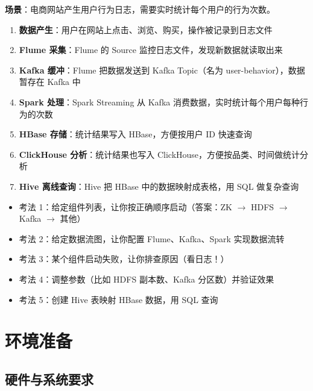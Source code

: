 \documentclass[12pt,a4paper]{article}
\begin{document}
\begin{knowledgebox}
\textbf{场景}：电商网站产生用户行为日志，需要实时统计每个用户的行为次数。

\begin{enumerate}
    \item \textbf{数据产生}：用户在网站上点击、浏览、购买，操作被记录到日志文件
    \item \textbf{Flume 采集}：Flume 的 Source 监控日志文件，发现新数据就读取出来
    \item \textbf{Kafka 缓冲}：Flume 把数据发送到 Kafka Topic（名为 user-behavior），数据暂存在 Kafka 中
    \item \textbf{Spark 处理}：Spark Streaming 从 Kafka 消费数据，实时统计每个用户每种行为的次数
    \item \textbf{HBase 存储}：统计结果写入 HBase，方便按用户 ID 快速查询
    \item \textbf{ClickHouse 分析}：统计结果也写入 ClickHouse，方便按品类、时间做统计分析
    \item \textbf{Hive 离线查询}：Hive 把 HBase 中的数据映射成表格，用 SQL 做复杂查询
\end{enumerate}
\end{knowledgebox}

\begin{tipbox}[竞赛中的常见考法]
\begin{itemize}
    \item 考法 1：给定组件列表，让你按正确顺序启动（答案：ZK $\rightarrow$ HDFS $\rightarrow$ Kafka $\rightarrow$ 其他）
    \item 考法 2：给定数据流图，让你配置 Flume、Kafka、Spark 实现数据流转
    \item 考法 3：某个组件启动失败，让你排查原因（看日志！）
    \item 考法 4：调整参数（比如 HDFS 副本数、Kafka 分区数）并验证效果
    \item 考法 5：创建 Hive 表映射 HBase 数据，用 SQL 查询
\end{itemize}
\end{tipbox}

\section{环境准备}

\subsection{硬件与系统要求}
\end{document}
